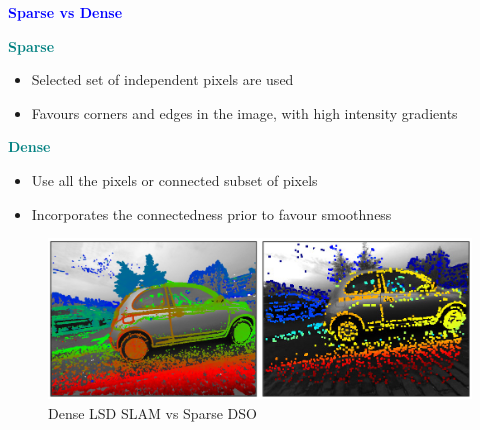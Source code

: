 \documentclass[aspectratio=169]{beamer}
\begin{document}
\begin{frame}{\textcolor{blue}{\textbf{Sparse vs Dense}}}
	\vspace{-0.5cm}
	\begin{block}{\textbf{\textcolor{teal}{Sparse}}}
	\begin{itemize}
			\item Selected set of independent pixels are used
			\item Favours corners and edges in the image, with high intensity gradients
	\end{itemize}
	\end{block}

	\begin{block}{\textbf{\textcolor{teal}{Dense}}}
		\begin{itemize}
				\item Use all the pixels or connected subset of pixels 
				\item Incorporates the connectedness prior to favour smoothness
	\end{itemize}
	\end{block}

	\begin{figure}
		\centering
		\includegraphics[height=0.2\textheight]{pics/dense_sparse.png}
		\caption{\scriptsize Dense LSD SLAM vs Sparse DSO}
	\end{figure}

\end{frame}
\end{document}
